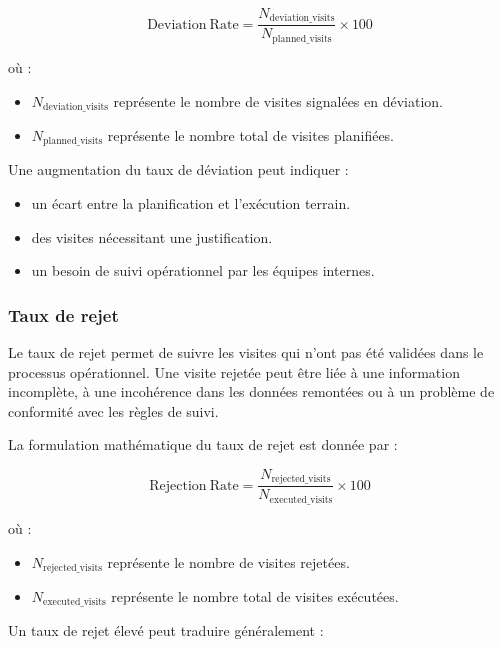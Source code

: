 \[
\mathrm{Deviation\ Rate} =
\frac{N_{\mathrm{deviation\_visits}}}
{N_{\mathrm{planned\_visits}}}
\times 100
\]

où :

\begin{itemize}
    \item $N_{\mathrm{deviation\_visits}}$ représente le nombre de visites signalées en déviation.
    \item $N_{\mathrm{planned\_visits}}$ représente le nombre total de visites planifiées.
\end{itemize}

Une augmentation du taux de déviation peut indiquer :

\begin{itemize}
    \item un écart entre la planification et l’exécution terrain.
    \item des visites nécessitant une justification.
    \item un besoin de suivi opérationnel par les équipes internes.
\end{itemize}


\subsubsection{Taux de rejet}

Le taux de rejet permet de suivre les visites qui n’ont pas été validées dans le processus opérationnel. Une visite rejetée peut être liée à une information incomplète, à une incohérence dans les données remontées ou à un problème de conformité avec les règles de suivi.

La formulation mathématique du taux de rejet est donnée par :

\[
\mathrm{Rejection\ Rate} =
\frac{N_{\mathrm{rejected\_visits}}}
{N_{\mathrm{executed\_visits}}}
\times 100
\]

où :

\begin{itemize}
    \item $N_{\mathrm{rejected\_visits}}$ représente le nombre de visites rejetées.
    \item $N_{\mathrm{executed\_visits}}$ représente le nombre total de visites exécutées.
\end{itemize}

Un taux de rejet élevé peut traduire généralement :


